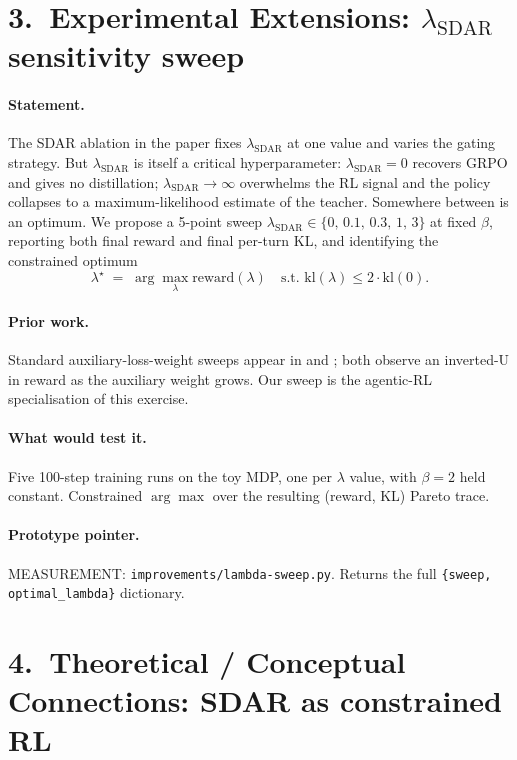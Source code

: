 \documentclass[11pt]{article}
\begin{document}
\section*{3.\ Experimental Extensions: $\lambda_{\mathrm{SDAR}}$ sensitivity sweep}

\paragraph{Statement.}  The SDAR ablation in the paper fixes
$\lambda_{\mathrm{SDAR}}$ at one value and varies the gating strategy.  But
$\lambda_{\mathrm{SDAR}}$ is itself a critical hyperparameter:
$\lambda_{\mathrm{SDAR}}=0$ recovers GRPO and gives no distillation;
$\lambda_{\mathrm{SDAR}}\to\infty$ overwhelms the RL signal and the policy
collapses to a maximum-likelihood estimate of the teacher.  Somewhere
between is an optimum.  We propose a 5-point sweep
$\lambda_{\mathrm{SDAR}} \in \{0,\,0.1,\,0.3,\,1,\,3\}$ at fixed $\beta$,
reporting both final reward and final per-turn KL, and identifying the
constrained optimum
\[
   \lambda^\star \;=\; \arg\max_\lambda \mathrm{reward}(\lambda)
   \quad \text{s.t.\ } \mathrm{kl}(\lambda)\le 2\cdot\mathrm{kl}(0).
\]

\paragraph{Prior work.}  Standard auxiliary-loss-weight sweeps appear in
\citet{deepseek2025r1} and \citet{zhao2026opsd}; both observe an inverted-U
in reward as the auxiliary weight grows.  Our sweep is the
agentic-RL specialisation of this exercise.

\paragraph{What would test it.}  Five 100-step training runs on the toy
MDP, one per $\lambda$ value, with $\beta=2$ held constant.  Constrained
$\arg\max$ over the resulting (reward, KL) Pareto trace.

\paragraph{Prototype pointer.}  MEASUREMENT:
\texttt{improvements/lambda-sweep.py}.  Returns the full
\verb|{sweep, optimal_lambda}| dictionary.

\section*{4.\ Theoretical / Conceptual Connections: SDAR as constrained RL}
\end{document}
